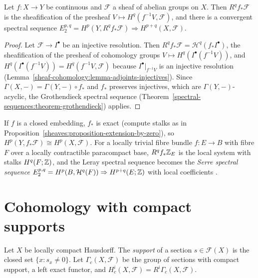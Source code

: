 \begin{theorem}\label{sheaf-cohomology:theorem-leray-spectral-sequence}
Let $f \colon X \to Y$ be continuous and $\mathcal{F}$ a sheaf of abelian groups on $X$. Then $R^qf_*\mathcal{F}$ is the sheafification of the presheaf $V \mapsto H^q(f^{-1}V, \mathcal{F})$,
and there is a convergent spectral sequence $E_2^{p,q} = H^p(Y, R^qf_*\mathcal{F}) \Rightarrow H^{p+q}(X, \mathcal{F})$.
\end{theorem}

\begin{proof}
Let $\mathcal{F} \to I^\bullet$ be an injective resolution. Then $R^qf_*\mathcal{F} = \mathcal{H}^q(f_*I^\bullet)$, the sheafification of the presheaf of cohomology groups
$V \mapsto H^q(I^\bullet(f^{-1}V))$, and $H^q(I^\bullet(f^{-1}V)) = H^q(f^{-1}V, \mathcal{F})$ because $I^\bullet|_{f^{-1}V}$ is an injective resolution
(Lemma~\ref{sheaf-cohomology:lemma-adjoints-injectives}). Since $\Gamma(X, -) = \Gamma(Y, -) \circ f_*$ and $f_*$ preserves injectives, which are $\Gamma(Y, -)$-acyclic, the Grothendieck
spectral sequence (Theorem~\ref{spectral-sequences:theorem-grothendieck}) applies.
\end{proof}

\begin{example}\label{sheaf-cohomology:example-leray}
If $f$ is a closed embedding, $f_*$ is exact (compute stalks as in Proposition~\ref{sheaves:proposition-extension-by-zero}), so $H^p(Y, f_*\mathcal{F}) \cong H^p(X, \mathcal{F})$. For a locally
trivial fibre bundle $f \colon E \to B$ with fibre $F$ over a locally contractible paracompact base, $R^qf_*\mathbb{Z}_E$ is the local system with stalks $H^q(F; \mathbb{Z})$, and the Leray spectral sequence
becomes the \emph{Serre spectral sequence} $E_2^{p,q} = H^p(B, \mathcal{H}^q(F)) \Rightarrow H^{p+q}(E; \mathbb{Z})$ with local coefficients \cite{bredon-sheaf}.
\end{example}

\section{Cohomology with compact supports}\label{sheaf-cohomology:section-compact-supports}

\begin{definition}\label{sheaf-cohomology:definition-compact-supports}
Let $X$ be locally compact Hausdorff. The \emph{support} of a section $s \in \mathcal{F}(X)$ is the closed set $\{x : s_x \neq 0\}$. Let $\Gamma_c(X, \mathcal{F})$ be the group of sections with
compact support, a left exact functor, and $H^i_c(X, \mathcal{F}) = R^i\Gamma_c(X, \mathcal{F})$.
\end{definition}


